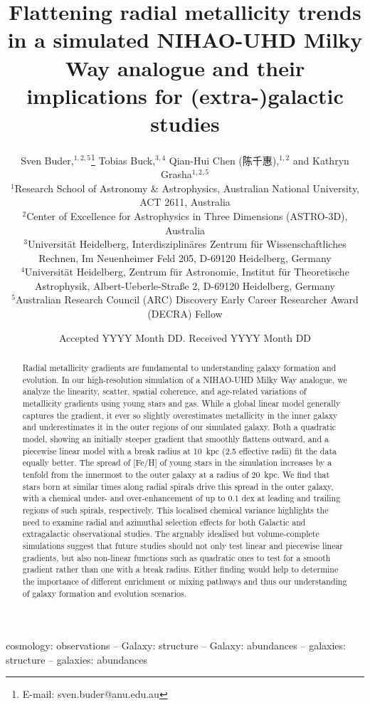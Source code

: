 \documentclass[fleqn,usenatbib]{mnras}
\title[The radial metallicity gradient in NIHAO-UHD]{Flattening radial metallicity trends in a simulated NIHAO-UHD Milky Way analogue and their implications for (extra-)galactic studies}
\author[S. Buder et al.]{
Sven Buder,$^{1,2,5}$\thanks{E-mail: sven.buder@anu.edu.au}
Tobias Buck,$^{3,4}$
Qian-Hui Chen (陈千惠),$^{1,2}$ and
Kathryn Grasha$^{1,2,5}$
\\
$^{1}$Research School of Astronomy \& Astrophysics, Australian National University, ACT 2611, Australia\\
$^{2}$Center of Excellence for Astrophysics in Three Dimensions (ASTRO-3D), Australia\\
$^{3}$Universit{\"a}t Heidelberg, Interdisziplin{\"a}res Zentrum f{\"u}r Wissenschaftliches Rechnen, Im Neuenheimer Feld 205, D-69120 Heidelberg, Germany\\
$^{4}$Universit{\"a}t Heidelberg, Zentrum f{\"u}r Astronomie, Institut f{\"u}r Theoretische Astrophysik, Albert-Ueberle-Straße 2, D-69120 Heidelberg, Germany\\
$^{5}$Australian Research Council (ARC) Discovery Early Career Researcher Award (DECRA) Fellow
}
\date{Accepted YYYY Month DD. Received YYYY Month DD}
\begin{document}
\label{firstpage}
\pagerange{\pageref{firstpage}--\pageref{lastpage}}
\begin{CJK}{UTF8}{gbsn}
\maketitle
\end{CJK}

\begin{abstract} %
Radial metallicity gradients are fundamental to understanding galaxy formation and evolution.
In our high-resolution simulation of a NIHAO-UHD Milky Way analogue, we analyze the linearity, scatter, spatial coherence, and age-related variations of metallicity gradients using young stars and gas.
While a global linear model generally captures the gradient, it ever so slightly overestimates metallicity in the inner galaxy and underestimates it in the outer regions of our simulated galaxy. Both a quadratic model, showing an initially steeper gradient that smoothly flattens outward, and a piecewise linear model with a break radius at 10~kpc (2.5 effective radii) fit the data equally better. The spread of [Fe/H] of young stars in the simulation increases by a tenfold from the innermost to the outer galaxy at a radius of 20~kpc. We find that stars born at similar times along radial spirals drive this spread in the outer galaxy, with a chemical under- and over-enhancement of up to 0.1 dex at leading and trailing regions of such spirals, respectively.
This localised chemical variance highlights the need to examine radial and azimuthal selection effects for both Galactic and extragalactic observational studies. The arguably idealised but volume-complete simulations suggest that future studies should not only test linear and piecewise linear gradients, but also non-linear functions such as quadratic ones to test for a smooth gradient rather than one with a break radius. Either finding would help to determine the importance of different enrichment or mixing pathways and thus our understanding of galaxy formation and evolution scenarios.
\end{abstract}
\begin{keywords}
cosmology: observations -- Galaxy: structure -- Galaxy: abundances  -- galaxies: structure -- galaxies: abundances
\end{keywords}
\end{document}
